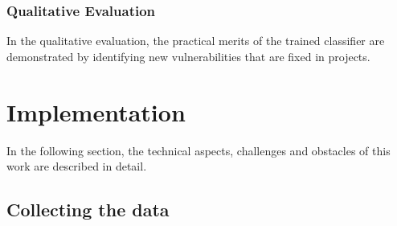 \documentclass[
	a4paper,
	pagesize,
	pdftex,
	12pt,
	twoside, %
	BCOR=5mm, %
	ngerman,
	fleqn,
	final,
	]{scrartcl}
\begin{document}
\subsubsection{Qualitative Evaluation}
In the qualitative evaluation, the practical merits of the trained classifier are demonstrated by identifying new vulnerabilities that are fixed in projects. 









\newpage
\section{Implementation}
In the following section, the technical aspects, challenges and obstacles of this work are described in detail.

\subsection{Collecting the data}
\end{document}
